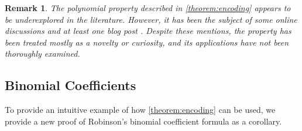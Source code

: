 \documentclass[10pt,a4paper]{article}
\theoremstyle{plain}
\newtheorem{remark}{Remark}[section]
\begin{document}
\begin{remark}
The polynomial property described in \cref{theorem:encoding} appears to be underexplored in the literature. However, it has been the subject of some online discussions \cite{mathoverflow2012application, reddit2023determine} and at least one blog post \cite{jcook2012polynomial}. Despite these mentions, the property has been treated mostly as a novelty or curiosity, and its applications have not been thoroughly examined.
\end{remark}

\subsection{Binomial Coefficients}
To provide an intuitive example of how \cref{theorem:encoding} can be used, we provide a new proof of Robinson's binomial coefficient formula \cite{robinson1952arithmetic} as a corollary.
\end{document}
